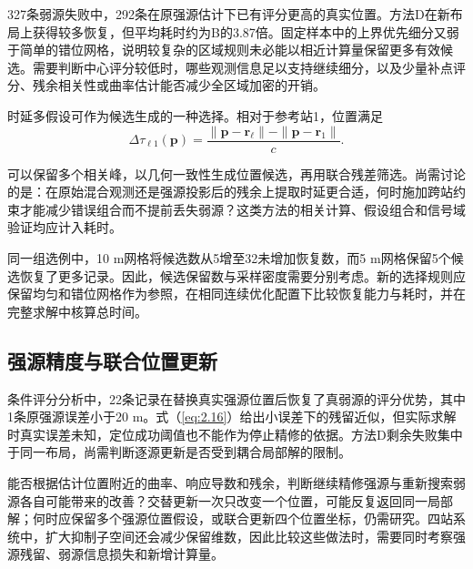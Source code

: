 \documentclass[11pt,a4paper]{article}
\numberwithin{equation}{section}
\numberwithin{figure}{section}
\numberwithin{table}{section}
\begin{document}
327条弱源失败中，292条在原强源估计下已有评分更高的真实位置。方法D在新布局上获得较多恢复，但平均耗时约为B的3.87倍。固定样本中的上界优先细分又弱于简单的错位网格，说明较复杂的区域规则未必能以相近计算量保留更多有效候选。需要判断中心评分较低时，哪些观测信息足以支持继续细分，以及少量补点评分、残余相关性或曲率估计能否减少全区域加密的开销。

时延多假设可作为候选生成的一种选择。相对于参考站1，位置满足
\begin{equation}\label{eq:4.1}
\Delta\tau_{\ell1}(\mathbf{p}) = \frac{\|\mathbf{p}-\mathbf{r}_\ell\|-\|\mathbf{p}-\mathbf{r}_1\|}{c}.
\end{equation}

可以保留多个相关峰，以几何一致性生成位置候选，再用联合残差筛选\cite{ref01,ref02,ref03}。尚需讨论的是：在原始混合观测还是强源投影后的残余上提取时延更合适，何时施加跨站约束才能减少错误组合而不提前丢失弱源？这类方法的相关计算、假设组合和信号域验证均应计入耗时。

同一组选例中，10 m网格将候选数从5增至32未增加恢复数，而5 m网格保留5个候选恢复了更多记录。因此，候选保留数与采样密度需要分别考虑。新的选择规则应保留均匀和错位网格作为参照，在相同连续优化配置下比较恢复能力与耗时，并在完整求解中核算总时间。

\Needspace{.23\textheight}
\subsection{强源精度与联合位置更新}\label{sec:4.3}

条件评分分析中，22条记录在替换真实强源位置后恢复了真弱源的评分优势，其中1条原强源误差小于20 m。式（\ref{eq:2.16}）给出小误差下的残留近似，但实际求解时真实误差未知，定位成功阈值也不能作为停止精修的依据。方法D剩余失败集中于同一布局，尚需判断逐源更新是否受到耦合局部解的限制。

能否根据估计位置附近的曲率、响应导数和残余，判断继续精修强源与重新搜索弱源各自可能带来的改善？交替更新一次只改变一个位置，可能反复返回同一局部解；何时应保留多个强源位置假设，或联合更新四个位置坐标，仍需研究。四站系统中，扩大抑制子空间还会减少保留维数\cite{ref07}，因此比较这些做法时，需要同时考察强源残留、弱源信息损失和新增计算量。

\clearpage
\end{document}
